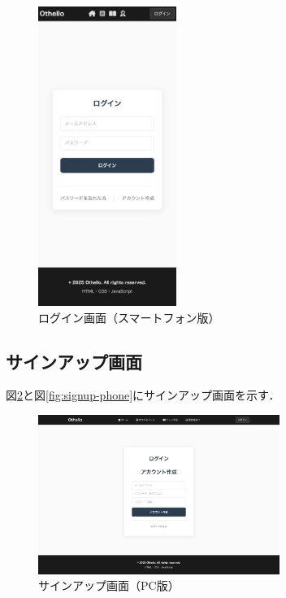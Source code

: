 \documentclass[10pt, a4paper]{jsarticle}
\begin{document}
\begin{figure}[H]
\centering
\includegraphics[width=0.4\textwidth]{img/login-phone.png}
\caption{ログイン画面（スマートフォン版）}
\label{fig:login-phone}
\end{figure}

\subsection{サインアップ画面}
図\ref{fig:signup-pc}と図\ref{fig:signup-phone}にサインアップ画面を示す．

\begin{figure}[H]
\centering
\includegraphics[width=0.7\textwidth]{img/signup-pc.png}
\caption{サインアップ画面（PC版）}
\label{fig:signup-pc}
\end{figure}
\end{document}
